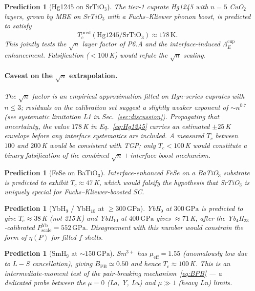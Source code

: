 \documentclass[11pt,a4paper]{article}
\newcommand{\BPB}{B_{\mathrm{PB}}}
\newcommand{\GPa}{\,\mathrm{GPa}}
\newcommand{\LamE}{\Lambda_{E}}
\newtheorem{prediction}[theorem]{Prediction}
\begin{document}
\begin{prediction}[Hg1245 on SrTiO$_{3}$]\label{pred:Hg1245}
The tier-1 cuprate Hg1245 with $n=5$ CuO$_{2}$ layers, grown by MBE on
SrTiO$_{3}$ with a Fuchs--Kliewer phonon boost, is predicted to satisfy
\begin{equation}\label{eq:Hg1245}
  T_{c}^{\mathrm{pred}}(\mathrm{Hg}1245/\mathrm{SrTiO}_{3})\approx 178\,\text{K}.
\end{equation}
This jointly tests the $\sqrt{n}$ layer factor of P6.A and the
interface-induced $\LamE^{\mathrm{cup}}$ enhancement. Falsification
($<100$\,K) would refute the $\sqrt{n}$ scaling.

\paragraph{Caveat on the $\sqrt{n}$ extrapolation.} The $\sqrt{n}$ factor
is an empirical approximation fitted on Hg$n$-series cuprates with
$n\leq 3$; residuals on the calibration set suggest a slightly weaker
exponent of $\sim n^{0.7}$ (see systematic limitation L1 in
Sec.~\ref{sec:discussion}). Propagating that uncertainty, the value
$178$\,K in Eq.~\eqref{eq:Hg1245} carries an estimated $\pm 25$\,K
envelope before any interface systematics are included. A measured
$T_{c}$ between $100$ and $200$\,K would be consistent with TGP; only
$T_{c}<100$\,K would constitute a \emph{binary} falsification of the
combined $\sqrt{n}$\,$+\,$interface-boost mechanism.
\end{prediction}

\begin{prediction}[FeSe on BaTiO$_{3}$]\label{pred:FeSe-BTO}
Interface-enhanced FeSe on a BaTiO$_{3}$ substrate is predicted to exhibit
$T_{c}\approx 47$\,K, which would falsify the hypothesis that SrTiO$_{3}$
is uniquely special for Fuchs--Kliewer-boosted SC.
\end{prediction}

\begin{prediction}[YbH$_{9}$ / YbH$_{10}$ at $\geq\!300\GPa$]\label{pred:YbH}
YbH$_{9}$ at $300\GPa$ is predicted to give $T_{c}\approx 38$\,K (not
215\,K) and YbH$_{10}$ at $400\GPa$ gives $\approx 71$\,K, after the
Yb$_{4}$H$_{23}$-calibrated $P_{\mathrm{scale}}^{\mathrm{Yb}}=552\GPa$.
Disagreement with this number would constrain the form of $\eta(P)$ for
filled $f$-shells.
\end{prediction}

\begin{prediction}[SmH$_{9}$ at $\sim\!150\GPa$]\label{pred:SmH9}
Sm$^{3+}$ has $\mu_{\mathrm{eff}}=1.55$ (anomalously low due to $L-S$
cancellation), giving $\BPB\simeq 0.50$ and hence $T_{c}\approx 100$\,K.
This is an intermediate-moment test of the pair-breaking
mechanism~\eqref{eq:BPB} --- a dedicated probe between the $\mu=0$
(La, Y, Lu) and $\mu\gg 1$ (heavy Ln) limits.
\end{prediction}
\end{document}
